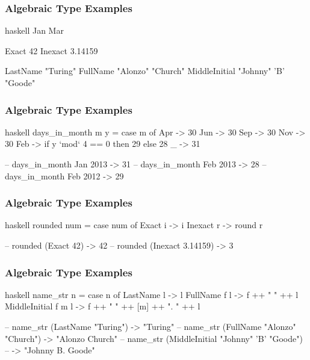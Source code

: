 \documentclass[dvipsnames]{beamer}
\theoremstyle{plain}
\begin{document}
\begin{frame}[fragile]
  \frametitle{Algebraic Type Examples}

  \begin{example}
    \begin{pygments}{haskell}
Jan
Mar

Exact 42
Inexact 3.14159

LastName "Turing"
FullName "Alonzo" "Church"
MiddleInitial "Johnny" 'B' "Goode"
    \end{pygments}
  \end{example}
\end{frame}

\begin{frame}[fragile]
  \frametitle{Algebraic Type Examples}

  \begin{example}
    \begin{pygments}{haskell}
days_in_month m y =
    case m of
      Apr -> 30
      Jun -> 30
      Sep -> 30
      Nov -> 30
      Feb -> if y `mod` 4 == 0 then 29 else 28
      _ -> 31

-- days_in_month Jan 2013 -> 31
-- days_in_month Feb 2013 -> 28
-- days_in_month Feb 2012 -> 29
    \end{pygments}
  \end{example}
\end{frame}

\begin{frame}[fragile]
  \frametitle{Algebraic Type Examples}

  \begin{example}
    \begin{pygments}{haskell}
rounded num =
    case num of
      Exact i -> i
      Inexact r -> round r

-- rounded (Exact 42) -> 42
-- rounded (Inexact 3.14159) -> 3
    \end{pygments}
  \end{example}
\end{frame}

\begin{frame}[fragile]
  \frametitle{Algebraic Type Examples}

  \begin{example}
    \begin{pygments}{haskell}
name_str n =
    case n of
      LastName l -> l
      FullName f l -> f ++ " " ++ l
      MiddleInitial f m l -> f ++ " " ++ [m] ++ ". " ++ l

-- name_str (LastName "Turing") -> "Turing"
-- name_str (FullName "Alonzo" "Church") -> "Alonzo Church"
-- name_str (MiddleInitial "Johnny" 'B' "Goode")
--     -> "Johnny B. Goode"
    \end{pygments}
  \end{example}
\end{frame}
\end{document}
